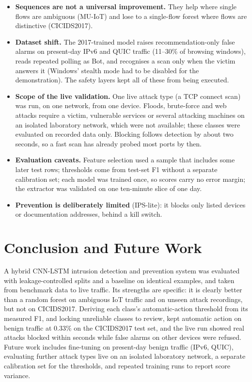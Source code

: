 \documentclass[conference]{IEEEtran}
\begin{document}
\begin{itemize}
\item \textbf{Sequences are not a universal improvement.} They help where
single flows are ambiguous (MU-IoT) and lose to a single-flow forest where
flows are distinctive (CICIDS2017).
\item \textbf{Dataset shift.} The 2017-trained model raises
recommendation-only false alarms on present-day IPv6 and QUIC traffic
(11--30\% of browsing windows), reads repeated polling as Bot, and recognises
a scan only when the victim answers it (Windows' stealth mode had to be
disabled for the demonstration). The safety layers kept all of these from
being executed.
\item \textbf{Scope of the live validation.} One live attack type (a TCP
connect scan) was run, on one network, from one device. Floods, brute-force
and web attacks require a victim, vulnerable services or several attacking
machines on an isolated laboratory network, which were not available; these
classes were evaluated on recorded data only. Blocking follows detection by
about two seconds, so a fast scan has already probed most ports by then.
\item \textbf{Evaluation caveats.} Feature selection used a sample that
includes some later test rows; thresholds come from test-set F1 without a
separate calibration set; each model was trained once, so scores carry no
error margin; the extractor was validated on one ten-minute slice of one day.
\item \textbf{Prevention is deliberately limited} (IPS-lite): it blocks only
listed devices or documentation addresses, behind a kill switch.
\end{itemize}

\section{Conclusion and Future Work}

A hybrid CNN-LSTM intrusion detection and prevention system was evaluated
with leakage-controlled splits and a baseline on identical examples, and
taken from benchmark data to live traffic. Its strengths are specific: it is
clearly better than a random forest on ambiguous IoT traffic and on unseen
attack recordings, but not on CICIDS2017. Deriving each class's
automatic-action threshold from its measured F1, and locking unreliable
classes to review, kept automatic action on benign traffic at 0.33\% on the
CICIDS2017 test set, and the live run showed real attacks blocked within
seconds while false alarms on other devices were refused. Future work
includes fine-tuning on present-day benign traffic (IPv6, QUIC), evaluating
further attack types live on an isolated laboratory network, a separate
calibration set for the thresholds, and repeated training runs to report
score variance.
\end{document}

